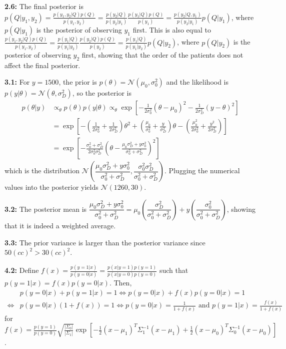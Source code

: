 \documentclass[12pt]{article}
\begin{document}
\textbf{2.6:} The final posterior is $p(Q|y_1,y_2)=\frac{p(y_1,y_2|Q)p(Q)}{p(y_1,y_2)}=\frac{p(y_2|Q)}{p(y_2|y_1)}\frac{p(y_1|Q)p(Q)}{p(y_1)}=\frac{p(y_2|Q,y_1)}{p(y_2|y_1)}p(Q|y_1)$, where $p(Q|y_1)$ is the posterior of observing $y_1$ first. This is also equal to $\frac{p(y_1,y_2|Q)p(Q)}{p(y_1,y_2)}=\frac{p(y_1|Q)}{p(y_1|y_2)}\frac{p(y_2|Q)p(Q)}{p(y_2)}=\frac{p(y_1|Q)}{p(y_1|y_2)}p(Q|y_2)$, where $p(Q|y_2)$ is the posterior of observing $y_2$ first, showing that the order of the patients does not affect the final posterior.

\textbf{3.1:} For $y=1500$, the prior is $p(\theta)=\mathcal{N}(\mu_0,\sigma_0^2)$ and the likelihood is $p(y|\theta)=\mathcal{N}(\theta,\sigma_D^2)$, so the posterior is\begin{align*}
    p(\theta|y)&\propto_{\theta}p(\theta)p(y|\theta)\propto_{\theta}\exp[-\frac{1}{2\sigma_0^2}(\theta-\mu_0)^2-\frac{1}{2\sigma_D^2}(y-\theta)^2]\\
    &=\exp[-(\frac{1}{2\sigma_0^2}+\frac{1}{2\sigma_D^2})\theta^2+(\frac{\mu_0}{\sigma_0^2}+\frac{y}{\sigma_D^2})\theta-(\frac{\mu_0^2}{2\sigma_0^2}+\frac{y^2}{2\sigma_D^2})]\\
    &=\exp[-\frac{\sigma_0^2+\sigma_D^2}{2\sigma_0^2\sigma_D^2}(\theta-\frac{\mu_0\sigma_D^2+y\sigma_0^2}{\sigma_0^2+\sigma_D^2})^2]
\end{align*}which is the distribution $\mathcal{N}(\dfrac{\mu_0\sigma_D^2+y\sigma_0^2}{\sigma_0^2+\sigma_D^2},\dfrac{\sigma_0^2\sigma_D^2}{\sigma_0^2+\sigma_D^2})$. Plugging the numerical values into the posterior yields $\mathcal{N}(1260,30)$.

\textbf{3.2:} The posterior mean is $\dfrac{\mu_0\sigma_D^2+y\sigma_0^2}{\sigma_0^2+\sigma_D^2}=\mu_0(\dfrac{\sigma_D^2}{\sigma_0^2+\sigma_D^2})+y(\dfrac{\sigma_0^2}{\sigma_0^2+\sigma_D^2})$, showing that it is indeed a weighted average.

\textbf{3.3:} The prior variance is larger than the posterior variance since $50(cc)^2>30(cc)^2$.

\textbf{4.2:} Define $f(x)=\frac{p(y=1|x)}{p(y=0|x)}=\frac{p(x|y=1)p(y=1)}{p(x|y=0)p(y=0)}$ such that $p(y=1|x)=f(x)p(y=0|x)$. Then,\begin{align*}
    &p(y=0|x)+p(y=1|x)=1\iff p(y=0|x)+f(x)p(y=0|x)=1\\
    \iff &p(y=0|x)(1+f(x))=1\iff p(y=0|x)=\frac{1}{1+f(x)}\text{ and }p(y=1|x)=\frac{f(x)}{1+f(x)}
\end{align*} for $f(x)=\frac{p(y=1)}{p(y=0)}\sqrt{\frac{|\Sigma_0|}{|\Sigma_1|}}\exp[-\frac{1}{2}(x-\mu_1)^T\Sigma_1^{-1}(x-\mu_1)+\frac{1}{2}(x-\mu_0)^T\Sigma_0^{-1}(x-\mu_0)]$.
\end{document}
